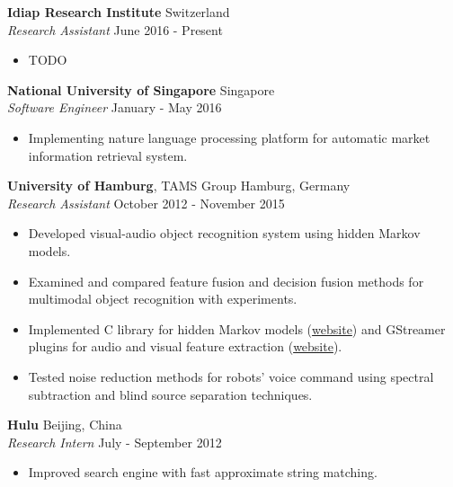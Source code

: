 \documentclass[a4paper,11pt]{article} %
\begin{document}
\textbf{Idiap Research Institute}  \hfill Switzerland \\
\textit{Research Assistant} \hfill June 2016 - Present
\vspace{-\parskip}
\begin{itemize}
  \item TODO
\end{itemize}

\textbf{National University of Singapore}  \hfill Singapore \\
\textit{Software Engineer} \hfill January - May 2016 
\vspace{-\parskip}
\begin{itemize}
  \item Implementing nature language processing platform for automatic market information retrieval system.
\end{itemize}


\textbf{University of Hamburg}, TAMS Group \hfill Hamburg, Germany \\
\textit{Research Assistant}  \hfill October 2012 - November 2015
\vspace{-\parskip}
\begin{itemize}
  \item Developed visual-audio object recognition system using hidden Markov models.
  \item Examined and compared feature fusion and decision fusion methods for multimodal object recognition with experiments.
  \item Implemented C library for hidden Markov models (\href{https://github.com/hwp/notGHMM}{website}) and GStreamer plugins for audio and visual feature extraction (\href{https://github.com/hwp/gval}{website}).
  \item Tested noise reduction methods for robots' voice command using spectral subtraction and blind source separation techniques.
\end{itemize}


\textbf{Hulu} \hfill Beijing, China \\
\textit{Research Intern} \hfill July - September 2012
\vspace{-\parskip}
\begin{itemize}
  \item Improved search engine with fast approximate string matching.
\end{itemize}
\end{document}
